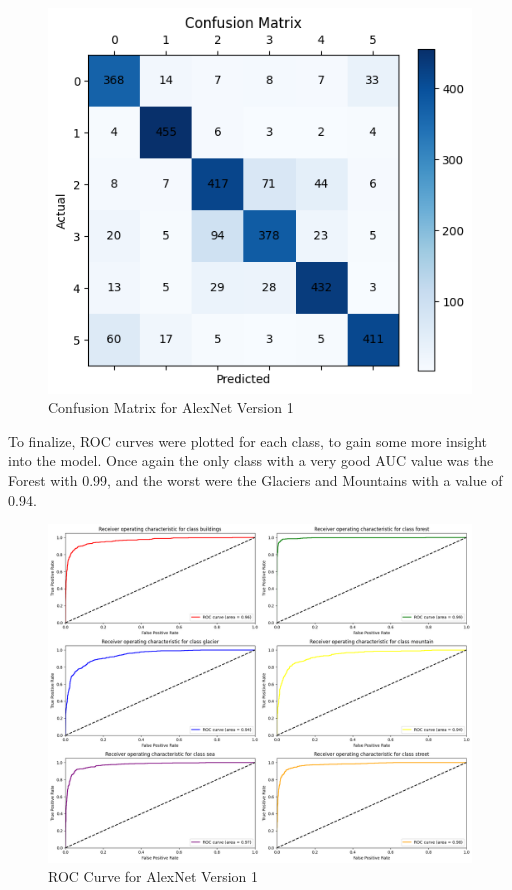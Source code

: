 \documentclass[conference]{IEEEtran}
\begin{document}
\begin{figure}[H]
    \centering
    \includegraphics[width=0.8\linewidth]{images/confusion_matrix_alex.png}
    \caption{Confusion Matrix for AlexNet Version 1}
    \label{fig:confusionMatrixAlex}
\end{figure}

To finalize, ROC curves were plotted for each class, to gain some more insight into the model. Once again the only class with a very good AUC value was the Forest with 0.99, and the worst were the Glaciers and Mountains with a value of 0.94.

\begin{figure}[H]
    \centering
    \includegraphics[width=0.9\linewidth]{images/roc_alex_1.png}
    \caption{ROC Curve for AlexNet Version 1}
    \label{fig:rocAlex1}
\end{figure}
\end{document}
